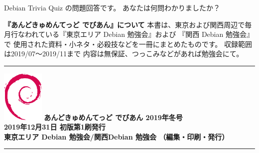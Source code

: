 \documentclass[mingoth,a4paper]{jsarticle}
\begin{document}

 Debian Trivia Quiz の問題回答です。
 あなたは何問わかりましたか？ \\

\cleartooddpage

\newpage
\thispagestyle{empty}\mbox{}
\newpage

\thispagestyle{empty}
{
\large
\begin{itembox}{\bf 『あんどきゅめんてっど でびあん』について}
本書は、東京および関西周辺で毎月行なわれている『東京エリア Debian 勉強会』および
『関西 Debian 勉強会』で
使用された資料・小ネタ・必殺技などを一冊にまとめたものです。
収録範囲は2019/07〜2019/11まで
内容は無保証、つっこみなどがあれば勉強会にて。
\end{itembox}
}

\vspace*{16cm}
{\color{dancerlightblue}\rule{\hsize}{1mm}}
\vspace{2mm}
\includegraphics[width=2cm]{image200502/openlogo-nd.eps}
\noindent \Large \bf あんどきゅめんてっど でびあん 2019年冬号\\
\noindent \normalfont 2019年12月31日 \hspace{5mm}  初版第1刷発行\\
\noindent \normalfont 東京エリア Debian 勉強会/関西Debian 勉強会 （編集・印刷・発行）\\
{\color{dancerdarkblue}\rule{\hsize}{1mm}}
\end{document}
